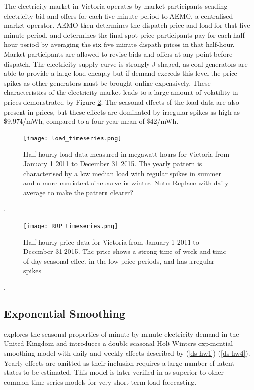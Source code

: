 \documentclass[12pt,a4paper]{article}%
\numberwithin{equation}{section}
\begin{document}
The electricity market in Victoria operates by market participants sending electricity bid and offers for each five minute period to  AEMO, a centralised market operator. AEMO then determines the dispatch price and load for that five minute period, and determines the final spot price participants pay for each half-hour period by averaging the six five minute dispath%
 prices in that half-hour. Market participants are allowed to revise bids and offers at any point before dispatch. The electricity supply curve is strongly J shaped, as coal generators are able to provide a large load cheaply but if demand exceeds this level the price spikes as other generators must be brought online expensively. These characteristics of the electricity market leads to a large amount of volatility in prices demonstrated by Figure \ref{rrpplot}. The seasonal effects of the load data are also present in prices, but these effects are dominated by irregular spikes as high as \$9,974/mWh, compared to a four year mean of \$42/mWh.

\begin{figure}[h]
\centering
\texttt{[image: load\_timeseries.png]}
\caption{Half hourly load data measured in megawatt hours for Victoria from January 1 2011 to December 31 2015. The yearly pattern is characterised by a low median load with regular spikes in summer and a more consistent sine curve in winter. Note: Replace with daily average to make the pattern clearer?}
\label{loadplot}
\end{figure}.


\begin{figure}[h]
\centering
\texttt{[image: RRP\_timeseries.png]}
\caption{Half hourly price data for Victoria from January 1 2011 to December 31 2015. The price shows a strong time of week and time of day seasonal effect in the low price periods, and has irregular spikes.}
\label{rrpplot}
\end{figure}.

\subsection{Exponential Smoothing}

\citet{Taylor2003} explores the seasonal properties of minute-by-minute electricity demand in the United Kingdom and introduces a double seasonal Holt-Winters exponential smoothing model with daily and weekly effects described by (\ref{ds-hw1})-(\ref{ds-hw4}). Yearly effects are omitted as their inclusion requires a large number of latent states to be estimated. This model is later verified 
in \citet{Taylor2008} as superior to other common time-series models for very short-term load forecasting.
\end{document}
